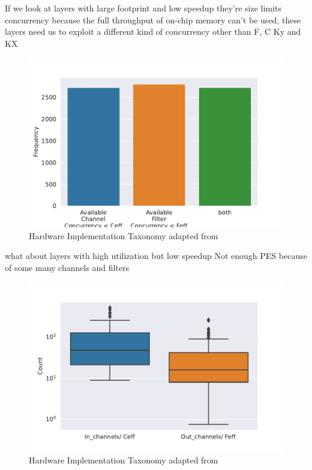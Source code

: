 If we look at layers with large footprint and low speedup they're size limits
concurrency because the full throughput of on-chip memory can't be used, these
layers need us to exploit a different kind of concurrency other than F, C Ky and
KX

\begin{figure}[ht]
    \centering
    \includegraphics[scale=0.58]{Plots/utilization/low_util_big_fmap.pdf}
    \caption{Hardware Implementation Taxonomy adapted from \cite{maestro}}
    \label{fig:hw_taxonomy}
\end{figure}

what about layers with high utilization but low speedup
Not enough PES because of some many channels and filters


\begin{figure}[ht]
    \centering
    \includegraphics[scale=0.58]{Plots/utilization/ratios.pdf}
    \caption{Hardware Implementation Taxonomy adapted from \cite{maestro}}
    \label{fig:hw_taxonomy}
\end{figure}

